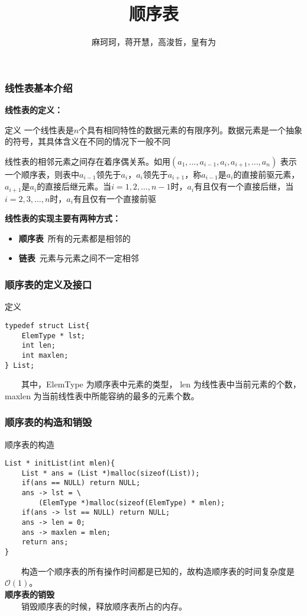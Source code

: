 \documentclass{beamer}
\author{麻珂珂，蒋开慧，高浚哲，皇有为}
\institute{XUPT}
\title{顺序表}
\begin{document}
	
	\frame{\titlepage}
	
	\begin{frame}[c]\frametitle{线性表基本介绍}
		\textbf{线性表的定义：}
		\begin{block}{定义}
			一个线性表是$n$个具有相同特性的数据元素的有限序列。数据元素是一个抽象的符号，其具体含义在不同的情况下一般不同 \par
			线性表的相邻元素之间存在着序偶关系。如用$(a_1,\dots, a_{i - 1}, a_i, a_{i + 1},\dots,a_n)$ 表示一个顺序表，则表中$a_{i - 1}$领先于$a_i$，$a_i$领先于$a_{i+1}$，称$a_{i-1}$是$a_i$的直接前驱元素，$a_{i+1}$是$a_i$的直接后继元素。当$i=1,2,\dots,n-1$时，$a_i$有且仅有一个直接后继，当$i=2,3,\dots,n$时，$a_i$有且仅有一个直接前驱
		\end{block}
		\textbf{线性表的实现主要有两种方式：}
		\begin{itemize}
			\item \textbf{顺序表}\ 所有的元素都是相邻的
			\item \textbf{链表}\ 元素与元素之间不一定相邻
		\end{itemize}
	\end{frame}
	
	\begin{frame}[fragile]\frametitle{顺序表的定义及接口}
		\begin{block}{定义}
\begin{verbatim}
typedef struct List{
    ElemType * lst;
    int len;
    int maxlen;
} List;
\end{verbatim}
		\end{block}
	\ \ \ \ 其中，ElemType 为顺序表中元素的类型， len 为线性表中当前元素的个数， maxlen 为当前线性表中所能容纳的最多的元素个数。
	\end{frame}

	\begin{frame}[fragile]\frametitle{顺序表的构造和销毁}
		\begin{block}{顺序表的构造}
\begin{verbatim}
List * initList(int mlen){
    List * ans = (List *)malloc(sizeof(List));
    if(ans == NULL) return NULL;
    ans -> lst = \
        (ElemType *)malloc(sizeof(ElemType) * mlen);
    if(ans -> lst == NULL) return NULL;
    ans -> len = 0;
    ans -> maxlen = mlen;
    return ans;
}
\end{verbatim}
		\end{block}
		\ \ \ \ 构造一个顺序表的所有操作时间都是已知的，故构造顺序表的时间复杂度是$\mathcal{O}(1)$。\\
		\textbf{顺序表的销毁}\\
		\ \ \ \ 销毁顺序表的时候，释放顺序表所占的内存。
	\end{frame}
\end{document}
